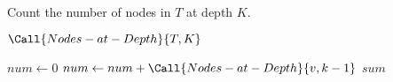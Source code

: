 
\begin{algorithm}[t]
  \caption{Count the number of nodes in $T$ at depth $K$.}
  \label{alg:nodes-at-depth-K}
  \begin{algorithmic}[1]
      \State \Return $\Call{Nodes-at-Depth}{T, K}$ 
    \EndProcedure

    \Statex
     
        \State {}
      \Else
        \State $num \gets 0$
	  \State $num \gets num + \Call{Nodes-at-Depth}{v, k - 1}$
	\EndFor
	\State \Return $sum$
      \EndIf
    \EndProcedure
  \end{algorithmic}
\end{algorithm}
